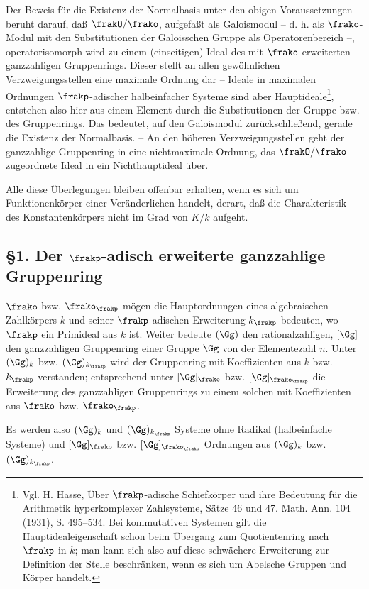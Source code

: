 Der Beweis für die Existenz der Normalbasis unter den obigen Voraussetzungen beruht darauf, daß \(\frakO/\frako\), aufgefaßt als Galoismodul -- d. h. als \(\frako\)-Modul mit den Substitutionen der Galoisschen Gruppe als Operatorenbereich --, operatorisomorph wird zu einem (einseitigen) Ideal des mit \(\frako\) erweiterten ganzzahligen Gruppenrings. Dieser stellt an allen gewöhnlichen Verzweigungsstellen eine maximale Ordnung dar -- Ideale in maximalen Ordnungen \(\frakp\)-adischer halbeinfacher Systeme sind aber Hauptideale\footnote{Vgl. H. Hasse, Über \(\frakp\)-adische Schiefkörper und ihre Bedeutung für die Arithmetik hyperkomplexer Zahlsysteme, Sätze 46 und 47. Math. Ann. 104 (1931), S. 495--534. Bei kommutativen Systemen gilt die Hauptidealeigenschaft schon beim Übergang zum Quotientenring nach \(\frakp\) in \(k\); man kann sich also auf diese schwächere Erweiterung zur Definition der Stelle beschränken, wenn es sich um Abelsche Gruppen und Körper handelt.}, entstehen also hier aus einem Element durch die Substitutionen der Gruppe bzw. des Gruppenrings. Das bedeutet, auf den Galoismodul zurückschließend, gerade die Existenz der Normalbasis. -- An den höheren Verzweigungsstellen geht der ganzzahlige Gruppenring in eine nichtmaximale Ordnung, das \(\frakO/\frako\) zugeordnete Ideal in ein Nichthauptideal über.

Alle diese Überlegungen bleiben offenbar erhalten, wenn es sich um Funktionenkörper einer Veränderlichen handelt, derart, daß die Charakteristik des Konstantenkörpers nicht im Grad von \(K/k\) aufgeht.

\subsection*{§1. Der \(\frakp\)-adisch erweiterte ganzzahlige Gruppenring}

\(\frako\) bzw. \(\frako_\frakp\) mögen die Hauptordnungen eines algebraischen Zahlkörpers \(k\) und seiner \(\frakp\)-adischen Erweiterung \(k_\frakp\) bedeuten, wo \(\frakp\) ein Primideal aus \(k\) ist. Weiter bedeute \((\Gg)\) den rationalzahligen, \([\Gg]\) den ganzzahligen Gruppenring einer Gruppe \(\Gg\) von der Elementezahl \(n\). Unter \((\Gg)_k\) bzw. \((\Gg)_{k_\frakp}\) wird der Gruppenring mit Koeffizienten aus \(k\) bzw. \(k_\frakp\) verstanden; entsprechend unter \([\Gg]_\frako\) bzw. \([\Gg]_{\frako_\frakp}\) die Erweiterung des ganzzahligen Gruppenrings zu einem solchen mit Koeffizienten aus \(\frako\) bzw. \(\frako_\frakp\).

Es werden also \((\Gg)_k\) und \((\Gg)_{k_\frakp}\) Systeme ohne Radikal (halbeinfache Systeme) und \([\Gg]_\frako\) bzw. \([\Gg]_{\frako_\frakp}\) Ordnungen aus \((\Gg)_k\) bzw. \((\Gg)_{k_\frakp}\).

